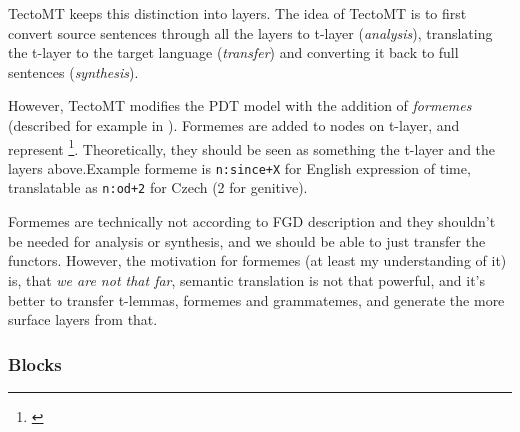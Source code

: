 TectoMT keeps this distinction into layers. 
The idea of TectoMT is to first convert source sentences through all the layers to t-layer (\emph{analysis}), translating the t-layer to the target language (\emph{transfer}) and converting it back to full sentences (\emph{synthesis}).

However, TectoMT modifies the PDT model with the addition of \emph{formemes} (described for example in \cite{zabokrtsky_hab}). Formemes are added to nodes on t-layer, and represent \footnote{\cite{zabokrtsky_hab}}. Theoretically, they should be seen as something  the t-layer and the layers above.Example formeme is \texttt{n:since+X} for English expression of time, translatable as \texttt{n:od+2} for Czech (2 for genitive).

Formemes are technically not  according to FGD description and they shouldn't be needed for analysis or synthesis, and we should be able to just transfer the functors. However, the motivation for formemes (at least my understanding of it) is, that \emph{we are not that far},  semantic translation is not that powerful, and it's better to transfer t-lemmas, formemes and grammatemes, and generate the more surface layers from that.

\subsubsection{Blocks}


